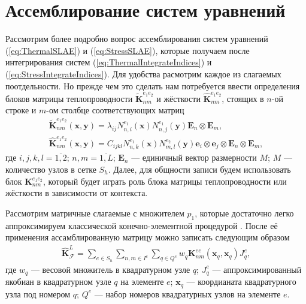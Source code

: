 \section{Ассемблирование систем уравнений}\label{sec:NumericalMethods/SLAEAssembling}

Рассмотрим более подробно вопрос ассемблирования систем уравнений (\ref{eq:ThermalSLAE}) и (\ref{eq:StressSLAE}), которые получаем после интегрирования систем (\ref{eq:ThermalIntegrateIndices}) и (\ref{eq:StressIntegrateIndices}). Для удобства расмотрим  каждое из слагаемых поотдельности. Но прежде чем это сделать нам потребуется ввести определения блоков матрицы теплопроводности $\widetilde{\textbf{K}}_{nm}^{e_1 e_2}$ и жёсткости $\widehat{\textbf{K}}_{nm}^{e_1 e_2}$, стоящих в $n$-ой строке и $m$-ом столбце соответствующих матриц
\begin{gather}
	\label{eq:ThermalBlock}
	\widetilde{\textbf{K}}_{nm}^{e_1 e_2} (\boldsymbol{x}, \boldsymbol{y}) =
	\lambda_{ij} N_{n,i}^{e_1} (\boldsymbol{x}) N_{n,j}^{e_1} (\boldsymbol{y})
	\boldsymbol{E}_n \otimes \boldsymbol{E}_m, \\
	\label{eq:StressBlock}
	\widehat{\textbf{K}}_{nm}^{e_1 e_2} (\boldsymbol{x}, \boldsymbol{y}) = 
	C_{ijkl} N_{n,k}^{e_1} (\boldsymbol{x}) N_{m,l}^{e_2} (\boldsymbol{y}) \boldsymbol{e}_i \otimes \boldsymbol{e}_j \otimes \boldsymbol{E}_n \otimes \boldsymbol{E}_m,
\end{gather}
где $i,j,k,l = \overline{1,2}$; $n,m = \overline{1,L}$; $\boldsymbol{E}_n$ --- единичный вектор размерности $M$; $M$ --- количество узлов в сетке $S_h$. Далее, для общности записи будем использовать блок $\textbf{K}_{nm}^{e_1 e_2}$, который будет играть роль блока матрицы теплопроводности или жёсткости в зависимости от контекста.

Рассмотрим матричные слагаемые с множителем $p_1$, которые достаточно легко аппроксимируем классической конечно-элементной процедурой \cite{Zienkiewicz, Bathe}. После её применения ассамблированную матрицу можно записать следующим образом
\begin{gather}
	\label{eq:LocalMatrix}
	\widehat{\textbf{K}}^L_{\mathcal{F}} =
	\sum\limits_{e \in S_h}
	\sum\limits_{n,m \in I^e}
	\sum\limits_{q \in Q^e}
	w_q \textbf{K}^{ee}_{nm} (\boldsymbol{x}_q, \boldsymbol{x}_q) J_q^e,
\end{gather}
где $w_q$ --- весовой множитель в квадратурном узле $q$;
$J_q^e$ --- аппроксимированный якобиан в квадратурном узле $q$ на элементе $e$;
$\boldsymbol{x}_q$ --- коордианата квадратурного узла под номером $q$;
$Q^e$ --- набор номеров квадратурных узлов на элементе $e$.

